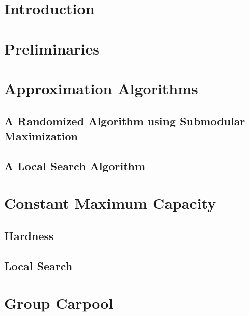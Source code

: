 \begin{abstract}

\end{abstract}

\section{Introduction}


\section{Preliminaries}
\label{sec:pre}


\section{Approximation Algorithms}
\label{sec:approx}


\subsection{A Randomized Algorithm using Submodular Maximization}
\label{sec:sub}


\subsection{A Local Search Algorithm}


\section{Constant Maximum Capacity}

	\subsection{Hardness}
	\label{sec:hardness}
	

	\subsection{Local Search}
	\label{sec:local}
	

\section{Group Carpool}
\label{sec:group}


